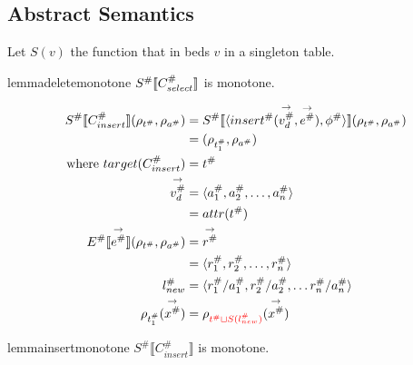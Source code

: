 \subsection{Abstract Semantics}

Let $S(v)$ the function that in beds $v$ in a singleton table.

\begin{restatable}{lemma}{deletemonotone}
    $S^\# \llbracket C_{select}^\# \rrbracket$ is monotone.
\end{restatable}

\begin{align*}
    S^\# \llbracket C_{insert}^\# \rrbracket (\rho_{t^\#}, \rho_{a^\#})
    &= S^\# \llbracket \langle insert^\#(\overset{\rightarrow}{v_d^\#}, \overset{\rightarrow}{e^\#}), \phi^\# \rangle \rrbracket (\rho_{t^\#}, \rho_{a^\#}) \\
    &= (\rho_{t_1^\#}, \rho_{a^\#}) \\
    \text{where } target(C_{insert}^\#) &= t^\# \\
    \overset{\rightarrow}{v_d^\#} &= \langle a_1^\#, a_2^\#, \dots, a_n^\# \rangle \\
    &= attr(t^\#) \\
    E^\# \llbracket \overset{\rightarrow}{e^\#} \rrbracket (\rho_{t^\#}, \rho_{a^\#})
    &= \overset{\rightarrow}{r^\#} \\
    &= \langle r_1^\#, r_2^\#, \dots, r_n^\# \rangle \\
    l_{new}^\# &= \langle r_1^\#/a_1^\#, r_2^\#/a_2^\#, \dots r_n^\#/a_n^\# \rangle \\
    \rho_{t_1^\#}(\overset{\rightarrow}{x^\#}) &= \rho_{\textcolor{red}{t^\# \sqcup S(l_{new}^\#)}}(\overset{\rightarrow}{x^\#})
\end{align*}

\begin{restatable}{lemma}{insertmonotone}
    $S^\# \llbracket C_{insert}^\# \rrbracket$ is monotone.
\end{restatable}

